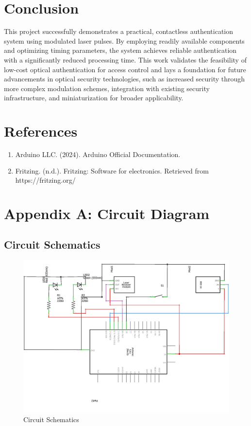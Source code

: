 \documentclass[12pt,a4paper]{article}
\begin{document}
\section{Conclusion}
This project successfully demonstrates a practical, contactless authentication system using modulated laser pulses. By employing readily available components and optimizing timing parameters, the system achieves reliable authentication with a significantly reduced processing time. This work validates the feasibility of low-cost optical authentication for access control and lays a foundation for future advancements in optical security technologies, such as increased security through more complex modulation schemes, integration with existing security infrastructure, and miniaturization for broader applicability.

\section{References}
\begin{enumerate}
    \item Arduino LLC. (2024). Arduino Official Documentation. 
    \item Fritzing. (n.d.). Fritzing: Software for electronics. Retrieved from https://fritzing.org/ 
\end{enumerate}

\appendix
\section{Appendix A: Circuit Diagram}

\subsection{Circuit Schematics}
\begin{figure}[h]
    \centering
    \includegraphics[width=0.59\linewidth]{schem.png}
    \caption{Circuit Schematics}
\end{figure}
\end{document}

